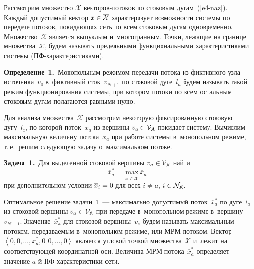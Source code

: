 \begin{multicols}{2}
\vspace*{-2pt}

Рассмотрим множество $\overline{\mathcal{X}}$ век\-то\-ров-по\-то\-ков 
по стоковым дугам~(\ref{e4-naz}).
Каждый допустимый вектор $\overline {x} \hm\in \overline{\mathcal{X}}$
 характеризует возможности системы  по передаче потоков, 
 покидающих сеть по всем стоковым дугам одновременно.
Множество~$\overline{\mathcal{X}}$ является выпуклым и~многогранным. 
Точки, лежащие на границе множества~$\overline{\mathcal{X}}$, будем называть 
предельными функциональными характеристиками системы (ПФ-ха\-рак\-те\-ри\-сти\-ками).

\smallskip

\noindent
\textbf{Определение~1.}\ 
Монопольным режимом  передачи потока из фиктивного уз\-ла-источ\-ни\-ка~$v_0$ 
в~фиктивный сток~$v_{N+1}$ по  стоковой дуге~$l_{a}$ будем называть такой 
режим функционирования системы, при котором потоки по всем остальным 
стоковым дугам полагаются равными нулю.

\smallskip

Для анализа множества~$\overline{\mathcal{X}}$ рассмотрим некоторую фиксированную 
стоковую дугу~$l_{a}$, по которой поток~$\overline {x}_a$ из вершины 
$v_a \hm\in \mathcal{V}_{\SK}$ покидает систему. Вычислим максимальную 
величину потока~$\overline {x}_a$ при работе системы в~монопольном режиме, т.\,е.\
 решим следующую задачу о~максимальном потоке.
 
 \smallskip

\noindent
\textbf{Задача~1.}\ Для выделенной стоковой вершины $v_a \hm\in \mathcal{V}_{\SK}$ 
найти
$$
 \overline {x}_a^* = \max\limits_{\overline {x} \in \overline{\mathcal{X}}} \overline {x}_a 
 $$
при дополнительном условии 
$\overline {x}_{i} \hm= 0$ {для всех} $i \not= a$,  $i \hm\in \mathcal{N}_{\SK}$.

\smallskip

Оптимальное решение задачи~1~--- максимально допустимый поток~$\overline {x}_a^*$ 
по дуге~$l_a$ из стоковой вершины 
$v_a \hm\in \mathcal{V}_{\SK}$ при передаче в~монопольном режиме  в~вершину~$v_{N+1}$.
Значение~$\overline {x}_a^*$ для стоковой вершины~$v_a$ будем называть максимальным 
потоком, передаваемым в~монопольном режиме, или МРМ-по\-то\-ком.
Вектор $\left\langle 0, 0, \ldots, \overline {x}_a^*, 0, 0, \ldots, 0\right\rangle $ 
является угловой точкой множества~$\overline{\mathcal{X}}$ и~лежит на соответствующей 
координатной оси. Величина МРМ-по\-то\-ка~$\overline {x}_a^*$ определяет 
значение $a$-й ПФ-ха\-рак\-те\-ри\-сти\-ки сети.


\end{multicols}
